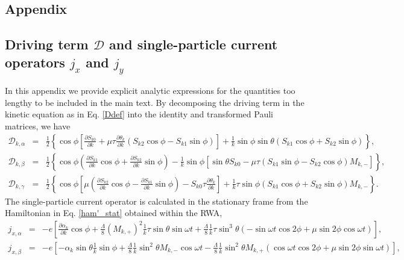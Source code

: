 \documentclass[reprint,amsmath,amssymb,aps,prb]{revtex4-1}
\begin{document}
\begin{widetext}

\section{Appendix} \label{sec:append}
  
\subsection{Driving term $\mathcal{D}$ and single-particle current operators $j_x$ and $j_y$} \label{app:Djcomp}
In this appendix we provide explicit analytic expressions for the quantities too lengthy to be included in the main text. By decomposing the driving term in the kinetic  equation as in Eq. \eqref{Ddef} into the identity and transformed Pauli matrices, we have  
%
\begin{eqnarray}
\mathcal{D}_{k,\alpha}&=&\frac{1}{2}\left\{\cos\phi\left[\frac{\partial S_{k0}}{\partial k}+\mu\tau\frac{\partial \theta_k}{\partial k}(S_{k2}\cos\phi-S_{k1}\sin\phi)\right]+\frac{1}{k}\sin\phi\sin\theta(S_{k1}\cos\phi+S_{k2}\sin\phi)\right\}, \\
\mathcal{D}_{k,\beta}&=&\frac{1}{2}\left\{\cos\phi\left(\frac{\partial S_{k1}}{\partial k}\cos\phi+\frac{\partial S_{k2}}{\partial k}\sin\phi\right)-\frac{1}{k}\sin\phi\left[\sin\theta S_{k0}-\mu\tau(S_{k1}\sin\phi-S_{k2}\cos\phi)M_{k,-}\right]\right\}, \\
\mathcal{D}_{k,\gamma}&=&\frac{1}{2}\left\{\cos\phi\left[\mu\left(\frac{\partial S_{k2}}{\partial k}\cos\phi-\frac{\partial S_{k1}}{\partial k}\sin\phi\right)-S_{k0}\tau\frac{\partial \theta_k}{\partial k}\right]+\frac{1}{k}\tau\sin\phi\left(S_{k1}\cos\phi+S_{k2}\sin\phi\right)M_{k,-}\right\}.
\end{eqnarray}
The single-particle current operator is calculated in the stationary frame from the Hamiltonian in Eq. \eqref{ham'_stat} obtained within the RWA, 
\begin{eqnarray}
j_{x,\alpha}&=&-e\left[\frac{\partial \alpha_k}{\partial k} \cos\phi+\frac{\Lambda}{8}(M_{k,+})^2 \frac{1}{k}\tau\sin\theta\sin\omega t+\frac{\Lambda}{8}\frac{1}{k}\tau\sin^3\theta(-\sin\omega t \cos 2\phi+\mu\sin 2 \phi\cos\omega t)\right], \\
j_{x,\beta}&=&-e\left[-\alpha_k\sin\theta\frac{1}{k}\sin\phi+\frac{\Lambda}{8}\frac{1}{k}\sin^2\theta M_{k,-}\cos\omega t-\frac{\Lambda}{8}\frac{1}{k}\sin^2\theta M_{k,+}(\cos\omega t \cos 2 \phi+\mu\sin 2 \phi\sin\omega t)\right], \\

\end{eqnarray}
\end{widetext}
\end{document}
